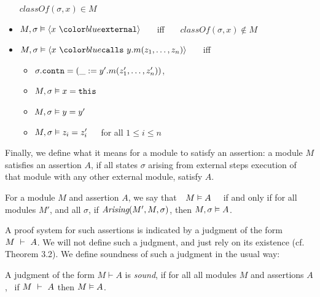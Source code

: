 \begin{definition}
\begin{itemize}
$\textit{classOf}(\sigma,x) \in M$
\item
$\satisfiesA{M}{\sigma}{\external{x}}$ \ \ \ iff \ \ \  
$\textit{classOf}(\sigma,x) \not\in M$
\item
$\satisfiesA{M}{\sigma}{\calls{x}{y}{m}{z_1, \ldots, z_n}}$ \ \ \ iff \ \ \ 
\begin{itemize}
\item
$\sigma.{\texttt{contn}} = (\_ := y'.m(z'_1,\ldots,z'_n))$, %
\item
$M , \sigma \vDash x = {\texttt{this}}$
\item
$M , \sigma \vDash y = y'$
\item
$M , \sigma \vDash z_i = z'_i$\ \ \ for all $1\!\leq i\!\leq n$
\end{itemize}
\end{itemize}
\end{definition}

 
Finally, we define what it means for a module to satisfy an assertion:
a module $M$ satisfies an assertion $A$, if all states $\sigma$
arising from external steps execution of that
module with any other external module, satisfy $A$. 
 
\begin{definition} 
\label{def:mdl-sat}
For a module $M$ and assertion $A$, we say that\ \  $M \vDash A$ \ \ if and only if 
for all modules $M'$, and all $\sigma$, if $\textit{Arising}(M', M, \sigma)$, then $M , \sigma \vDash A$.
\end{definition}



A proof system for such assertions is indicated by a judgment of the form $M\ \vdash\ A$. 
We will not define such a judgment, and just rely on its existence (cf. Theorem 3.2).
We define soundness of such a judgment in the usual way:

\begin{definition}
\label{ax:specW-prove-soundness}
A judgment of the form $M \vdash A$ is \emph{sound}, if for all
  all modules $M$ and assertions $A$, \ if $M\ \vdash\ A$ then $M \vDash A$.
\end{definition}

